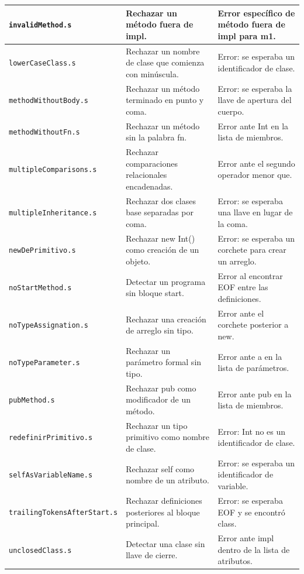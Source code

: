 \begin{longtable}{|
>{\raggedright\arraybackslash}p{}|
>{\raggedright\arraybackslash}p{}|
>{\raggedright\arraybackslash}p{}|}
\texttt{invalidMethod\allowbreak .s} & Rechazar un método fuera de impl. & Error específico de método fuera de impl para m1. \\ \hline
\texttt{lowerCaseClass\allowbreak .s} & Rechazar un nombre de clase que comienza con minúscula. & Error: se esperaba un identificador de clase. \\ \hline
\texttt{methodWithoutBody\allowbreak .s} & Rechazar un método terminado en punto y coma. & Error: se esperaba la llave de apertura del cuerpo. \\ \hline
\texttt{methodWithoutFn\allowbreak .s} & Rechazar un método sin la palabra fn. & Error ante Int en la lista de miembros. \\ \hline
\texttt{multipleComparisons\allowbreak .s} & Rechazar comparaciones relacionales encadenadas. & Error ante el segundo operador menor que. \\ \hline
\texttt{multipleInheritance\allowbreak .s} & Rechazar dos clases base separadas por coma. & Error: se esperaba una llave en lugar de la coma. \\ \hline
\texttt{newDePrimitivo\allowbreak .s} & Rechazar new Int() como creación de un objeto. & Error: se esperaba un corchete para crear un arreglo. \\ \hline
\texttt{noStartMethod\allowbreak .s} & Detectar un programa sin bloque start. & Error al encontrar EOF entre las definiciones. \\ \hline
\texttt{noTypeAssignation\allowbreak .s} & Rechazar una creación de arreglo sin tipo. & Error ante el corchete posterior a new. \\ \hline
\texttt{noTypeParameter\allowbreak .s} & Rechazar un parámetro formal sin tipo. & Error ante a en la lista de parámetros. \\ \hline
\texttt{pubMethod\allowbreak .s} & Rechazar pub como modificador de un método. & Error ante pub en la lista de miembros. \\ \hline
\texttt{redefinirPrimitivo\allowbreak .s} & Rechazar un tipo primitivo como nombre de clase. & Error: Int no es un identificador de clase. \\ \hline
\texttt{selfAsVariableName\allowbreak .s} & Rechazar self como nombre de un atributo. & Error: se esperaba un identificador de variable. \\ \hline
\texttt{trailingTokensAfterStart\allowbreak .s} & Rechazar definiciones posteriores al bloque principal. & Error: se esperaba EOF y se encontró class. \\ \hline
\texttt{unclosedClass\allowbreak .s} & Detectar una clase sin llave de cierre. & Error ante impl dentro de la lista de atributos. \\ \hline

\end{longtable}
